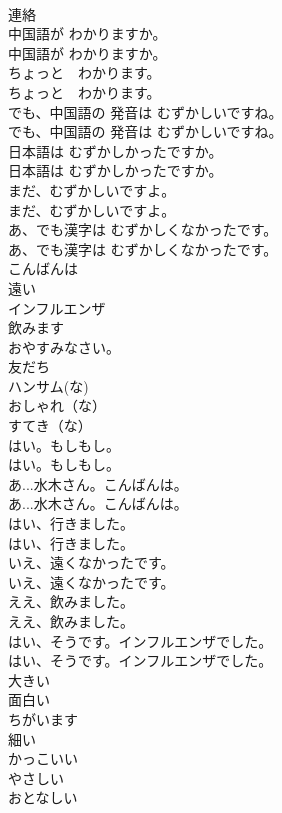 \documentclass[8pt]{extreport}
\begin{document}
\begin{CJK}{UTF8}{min}
\\	連絡
\\	中国語が わかりますか。	
\\	中国語が わかりますか。 
\\	ちょっと　わかります。	
\\	ちょっと　わかります。 
\\	でも、中国語の 発音は むずかしいですね。	
\\	でも、中国語の 発音は むずかしいですね。 
\\	日本語は むずかしかったですか。	
\\	日本語は むずかしかったですか。 
\\	まだ、むずかしいですよ。	
\\	まだ、むずかしいですよ。 
\\	あ、でも漢字は むずかしくなかったです。	
\\	あ、でも漢字は むずかしくなかったです。 
\\	こんばんは
\\	遠い
\\	インフルエンザ
\\	飲みます
\\	おやすみなさい。
\\	友だち
\\	ハンサム(な)
\\	おしゃれ（な）
\\	すてき（な）
\\	はい。もしもし。	
\\	はい。もしもし。 
\\	あ...水木さん。こんばんは。	
\\	あ...水木さん。こんばんは。 
\\	はい、行きました。	
\\	はい、行きました。 
\\	いえ、遠くなかったです。	
\\	いえ、遠くなかったです。 
\\	ええ、飲みました。	
\\	ええ、飲みました。 
\\	はい、そうです。インフルエンザでした。	
\\	はい、そうです。インフルエンザでした。 
\\	大きい
\\	面白い
\\	ちがいます
\\	細い
\\	かっこいい
\\	やさしい
\\	おとなしい

\end{CJK}
\end{document}
